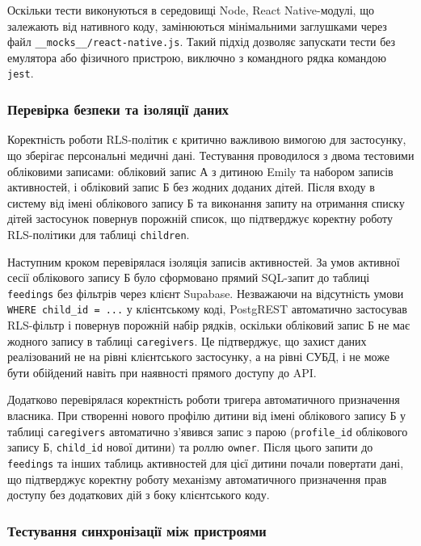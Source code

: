 Оскільки тести виконуються в середовищі Node, React Native-модулі, що залежають від нативного коду, замінюються мінімальними заглушками через файл \texttt{\_\_mocks\_\_/react-native.js}. Такий підхід дозволяє запускати тести без емулятора або фізичного пристрою, виключно з командного рядка командою \texttt{jest}.

\subsubsection{Перевірка безпеки та ізоляції даних}

Коректність роботи \gls{RLS}-політик є критично важливою вимогою для застосунку, що зберігає персональні медичні дані. Тестування проводилося з двома тестовими обліковими записами: обліковий запис А з дитиною Emily та набором записів активностей, і обліковий запис Б без жодних доданих дітей. Після входу в систему від імені облікового запису Б та виконання запиту на отримання списку дітей застосунок повернув порожній список, що підтверджує коректну роботу \gls{RLS}-політики для таблиці \texttt{children}.

Наступним кроком перевірялася ізоляція записів активностей. За умов активної сесії облікового запису Б було сформовано прямий \gls{SQL}-запит до таблиці \texttt{feedings} без фільтрів через клієнт Supabase. Незважаючи на відсутність умови \texttt{WHERE child\_id = ...} у клієнтському коді, PostgREST автоматично застосував \gls{RLS}-фільтр і повернув порожній набір рядків, оскільки обліковий запис Б не має жодного запису в таблиці \texttt{caregivers}. Це підтверджує, що захист даних реалізований не на рівні клієнтського застосунку, а на рівні \gls{СУБД}, і не може бути обійдений навіть при наявності прямого доступу до \gls{API}.

Додатково перевірялася коректність роботи тригера автоматичного призначення власника. При створенні нового профілю дитини від імені облікового запису Б у таблиці \texttt{caregivers} автоматично з'явився запис з парою (\texttt{profile\_id} облікового запису Б, \texttt{child\_id} нової дитини) та роллю \texttt{owner}. Після цього запити до \texttt{feedings} та інших таблиць активностей для цієї дитини почали повертати дані, що підтверджує коректну роботу механізму автоматичного призначення прав доступу без додаткових дій з боку клієнтського коду.

\subsubsection{Тестування синхронізації між пристроями}

